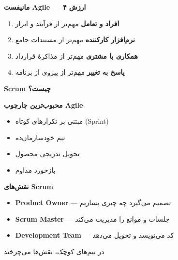 \documentclass[14pt, a4paper, landscape]{extarticle}
\newcommand{\slide}[1]{%
    \newpage
    \begin{center}
    \begin{minipage}[t]{0.95\textwidth}
    \vspace{0.5cm}
    #1
    \vspace{0.5cm}
    \end{minipage}
    \end{center}
}
\newcommand{\slidetitle}[1]{%
    \begin{center}
        {\LARGE\bfseries\textcolor{primary}{#1}}
    \end{center}
    \vspace{0.5cm}
}
\newcommand{\myaccent}[1]{\textcolor{accent}{#1}}
\begin{document}
\slide{
    \slidetitle{مانیفست Agile — ۴ ارزش}
    \vspace{0.5cm}
    \begin{enumerate}[itemsep=0.8em]
        \item {\large\textbf{افراد و تعامل} مهم‌تر از فرآیند و ابزار}
        \item {\large\textbf{نرم‌افزار کارکننده} مهم‌تر از مستندات جامع}
        \item {\large\textbf{همکاری با مشتری} مهم‌تر از مذاکرهٔ قرارداد}
        \item {\large\textbf{پاسخ به تغییر} مهم‌تر از پیروی از برنامه}
    \end{enumerate}
}


\slide{
    \slidetitle{Scrum چیست؟}
    \vspace{0.5cm}
    \begin{center}
        {\large\bfseries محبوب‌ترین چارچوب Agile}
    \end{center}
    \vspace{1cm}
    \begin{itemize}[itemsep=0.6em]
        \item {\large مبتنی بر تکرارهای کوتاه (Sprint)}
        \item {\large تیم خودسازمان‌ده}
        \item {\large تحویل تدریجی محصول}
        \item {\large بازخورد مداوم}
    \end{itemize}
}

\slide{
    \slidetitle{نقش‌های Scrum}
    \vspace{0.5cm}
    \begin{itemize}[itemsep=0.8em]
        \item {\large\textbf{\textcolor{primary}{Product Owner}} — تصمیم می‌گیرد چه چیزی بسازیم}
        \vspace{0.3cm}
        \item {\large\textbf{\textcolor{primary}{Scrum Master}} — جلسات و موانع را مدیریت می‌کند}
        \vspace{0.3cm}
        \item {\large\textbf{\textcolor{primary}{Development Team}} — کد می‌نویسد و تحویل می‌دهد}
    \end{itemize}
    \vspace{1cm}
    \begin{center}
        {\myaccent{در تیم‌های کوچک، نقش‌ها می‌چرخند}}
    \end{center}
}
\end{document}
